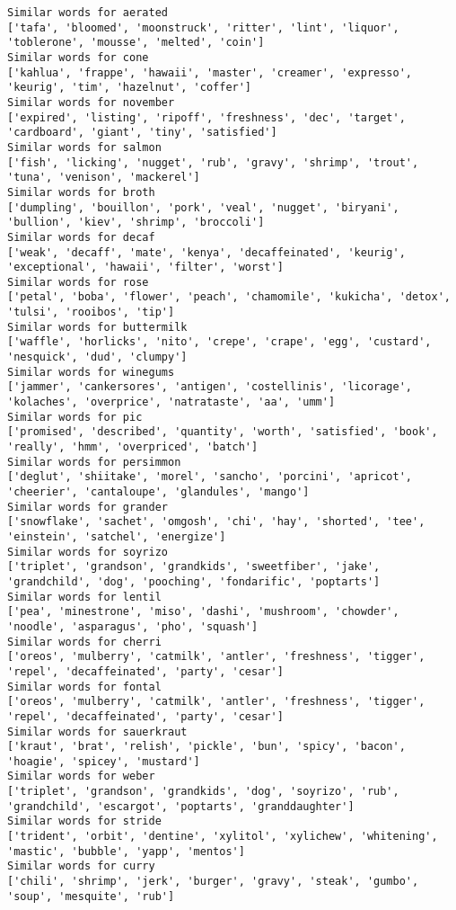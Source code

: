 \documentclass[11pt]{article}
\begin{document}
\begin{Verbatim}[commandchars=\\\{\}]
Similar words for aerated
['tafa', 'bloomed', 'moonstruck', 'ritter', 'lint', 'liquor', 'toblerone', 'mousse', 'melted', 'coin']
Similar words for cone
['kahlua', 'frappe', 'hawaii', 'master', 'creamer', 'expresso', 'keurig', 'tim', 'hazelnut', 'coffer']
Similar words for november
['expired', 'listing', 'ripoff', 'freshness', 'dec', 'target', 'cardboard', 'giant', 'tiny', 'satisfied']
Similar words for salmon
['fish', 'licking', 'nugget', 'rub', 'gravy', 'shrimp', 'trout', 'tuna', 'venison', 'mackerel']
Similar words for broth
['dumpling', 'bouillon', 'pork', 'veal', 'nugget', 'biryani', 'bullion', 'kiev', 'shrimp', 'broccoli']
Similar words for decaf
['weak', 'decaff', 'mate', 'kenya', 'decaffeinated', 'keurig', 'exceptional', 'hawaii', 'filter', 'worst']
Similar words for rose
['petal', 'boba', 'flower', 'peach', 'chamomile', 'kukicha', 'detox', 'tulsi', 'rooibos', 'tip']
Similar words for buttermilk
['waffle', 'horlicks', 'nito', 'crepe', 'crape', 'egg', 'custard', 'nesquick', 'dud', 'clumpy']
Similar words for winegums
['jammer', 'cankersores', 'antigen', 'costellinis', 'licorage', 'kolaches', 'overprice', 'natrataste', 'aa', 'umm']
Similar words for pic
['promised', 'described', 'quantity', 'worth', 'satisfied', 'book', 'really', 'hmm', 'overpriced', 'batch']
Similar words for persimmon
['deglut', 'shiitake', 'morel', 'sancho', 'porcini', 'apricot', 'cheerier', 'cantaloupe', 'glandules', 'mango']
Similar words for grander
['snowflake', 'sachet', 'omgosh', 'chi', 'hay', 'shorted', 'tee', 'einstein', 'satchel', 'energize']
Similar words for soyrizo
['triplet', 'grandson', 'grandkids', 'sweetfiber', 'jake', 'grandchild', 'dog', 'pooching', 'fondarific', 'poptarts']
Similar words for lentil
['pea', 'minestrone', 'miso', 'dashi', 'mushroom', 'chowder', 'noodle', 'asparagus', 'pho', 'squash']
Similar words for cherri
['oreos', 'mulberry', 'catmilk', 'antler', 'freshness', 'tigger', 'repel', 'decaffeinated', 'party', 'cesar']
Similar words for fontal
['oreos', 'mulberry', 'catmilk', 'antler', 'freshness', 'tigger', 'repel', 'decaffeinated', 'party', 'cesar']
Similar words for sauerkraut
['kraut', 'brat', 'relish', 'pickle', 'bun', 'spicy', 'bacon', 'hoagie', 'spicey', 'mustard']
Similar words for weber
['triplet', 'grandson', 'grandkids', 'dog', 'soyrizo', 'rub', 'grandchild', 'escargot', 'poptarts', 'granddaughter']
Similar words for stride
['trident', 'orbit', 'dentine', 'xylitol', 'xylichew', 'whitening', 'mastic', 'bubble', 'yapp', 'mentos']
Similar words for curry
['chili', 'shrimp', 'jerk', 'burger', 'gravy', 'steak', 'gumbo', 'soup', 'mesquite', 'rub']

\end{Verbatim}
\end{document}
